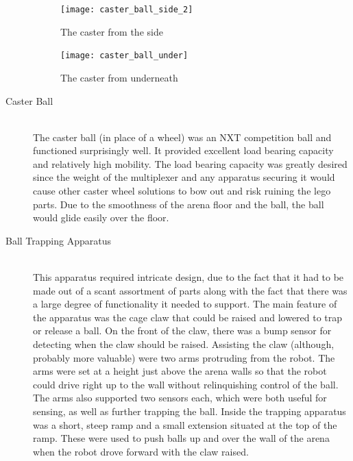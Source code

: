 \documentclass{article}
\begin{document}
\begin{description}

  \begin{figure}[h!]
    \centering
    \begin{minipage}{.5\textwidth}
      \centering
      \texttt{[image: caster\_ball\_side\_2]}%
      \caption{The caster from the side}
      \label{fig:caster_ball_side}
    \end{minipage}%
    \begin{minipage}{.4\textwidth}
      \centering
      \texttt{[image: caster\_ball\_under]}
      \caption{The caster from underneath}
      \label{fig:caster_ball_under}
    \end{minipage}
  \end{figure}

  \item[Caster Ball] \hfill \\
  The caster ball (in place of a wheel) was an NXT competition ball and functioned surprisingly well. It provided excellent load bearing capacity and relatively high mobility. The load bearing capacity was greatly desired since the weight of the multiplexer and any apparatus securing it would cause other caster wheel solutions to bow out and risk ruining the lego parts. Due to the smoothness of the arena floor and the ball, the ball would glide easily over the floor.

  \item[Ball Trapping Apparatus] \hfill \\
  This apparatus required intricate design, due to the fact that it had to be made out of a scant assortment of parts along with the fact that there was a large degree of functionality it needed to support. The main feature of the apparatus was the cage claw that could be raised and lowered to trap or release a ball. On the front of the claw, there was a bump sensor for detecting when the claw should be raised. Assisting the claw (although, probably more valuable) were two arms protruding from the robot. The arms were set at a height just above the arena walls so that the robot could drive right up to the wall without relinquishing control of the ball. The arms also supported two sensors each, which were both useful for sensing, as well as further trapping the ball. Inside the trapping apparatus was a short, steep ramp and a small extension situated at the top of the ramp. These were used to push balls up and over the wall of the arena when the robot drove forward with the claw raised.


\end{description}
\end{document}
